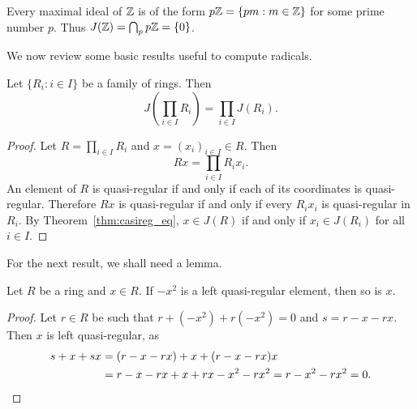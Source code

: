 \begin{example}
  Every maximal ideal of $\mathbb{Z}$ is of the form $p\mathbb{Z}=\{pm:m\in\mathbb{Z}\}$ for some
  prime number $p$.  Thus $J(\mathbb{Z})=\bigcap_p p\mathbb{Z}=\{0\}$.
\end{example}


We now review some basic results useful to compute radicals. 

\begin{proposition}
	Let $\{R_i:i\in I\}$ be a family of rings. Then 
	\[
	J\left(\prod_{i\in I}R_i\right)=\prod_{i\in I}J(R_i).
	\]
\end{proposition}

\begin{proof}
  Let $R=\prod_{i\in I}R_i$ and $x=(x_i)_{i\in I}\in R$. Then
  \[
    Rx=\prod_{i\in I}R_ix_i.
  \]
  An element of $R$ is quasi-regular if and only if each of its coordinates is
  quasi-regular. Therefore $Rx$ is quasi-regular if and only if every $R_ix_i$
  is quasi-regular in $R_i$. By Theorem~\ref{thm:casireg_eq}, $x\in J(R)$ if
  and only if $x_i\in J(R_i)$ for all $i\in I$.
\end{proof}

For the next result, we shall need a lemma.

\begin{lemma}
	\label{lemma:trickJ1}
	Let $R$ be a ring and $x\in R$. 
	If $-x^2$ is a left quasi-regular element, then so is $x$. 
\end{lemma}

\begin{proof}
	Let $r\in R$ be such that $r+(-x^2)+r(-x^2)=0$ and $s=r-x-rx$. Then
    $x$ is left quasi-regular, as 
    \begin{align*}
		s+x+sx&=(r-x-rx)+x+(r-x-rx)x\\
		&=r-x-rx+x+rx-x^2-rx^2=r-x^2-rx^2=0.\qedhere 
\end{align*}
\end{proof}

